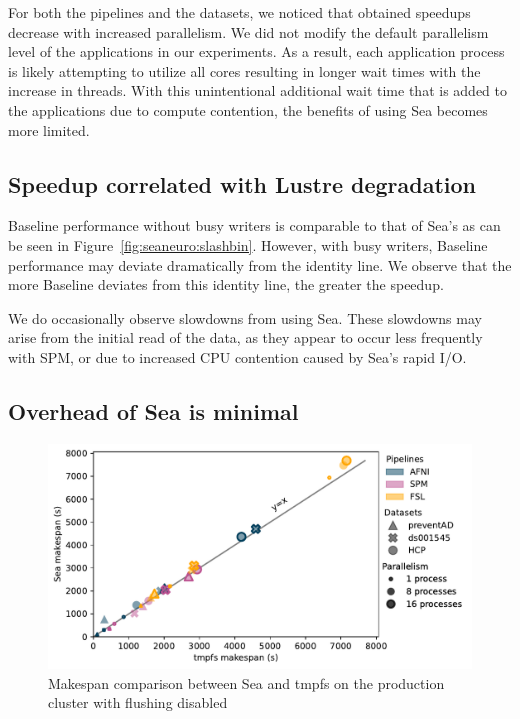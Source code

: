 For both the pipelines and the datasets, we noticed that obtained speedups
decrease with increased parallelism. We did not modify the default parallelism
level of the applications in our experiments. As a result, each application
process is likely attempting to utilize all cores resulting in longer wait times
with the increase in threads. With this unintentional additional wait time that
is added to the applications due to compute contention, the benefits of using
Sea becomes more limited.


\subsection{Speedup correlated with Lustre degradation}

Baseline performance without busy writers is comparable to that of Sea's as can be seen in Figure~\ref{fig:seaneuro:slashbin}. However, with
busy writers, Baseline performance may deviate dramatically from the identity
line. We observe that the more Baseline deviates from this identity line, the
greater the speedup.

We do occasionally observe slowdowns from using Sea. These slowdowns
may arise from the initial read of the data, as they appear to occur less
frequently with SPM, or due to increased CPU contention caused by Sea's rapid I/O.



\subsection{Overhead of Sea is minimal}


\begin{figure}
\centering
\includegraphics[width=\columnwidth]{figures/sea-neuro/beluga_sea_tmpfs.pdf}%
\caption{Makespan comparison between Sea and tmpfs on the production cluster with flushing disabled}
\label{fig:seaneuro:tmpfs}
\end{figure}

